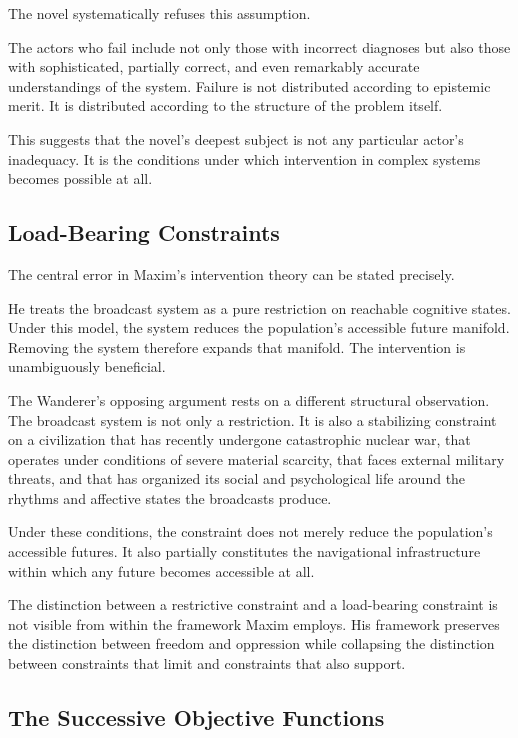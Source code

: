\documentclass[12pt, a4paper]{article}
\theoremstyle{plain}
\theoremstyle{definition}
\theoremstyle{remark}
\begin{document}
The novel systematically refuses this assumption.

The actors who fail include not only those with
incorrect diagnoses but also those with
sophisticated, partially correct, and even
remarkably accurate understandings of the system.
Failure is not distributed according to epistemic
merit. It is distributed according to the structure
of the problem itself.

This suggests that the novel's deepest subject is
not any particular actor's inadequacy. It is the
conditions under which intervention in complex
systems becomes possible at all.

\subsection{Load-Bearing Constraints}

The central error in Maxim's intervention theory
can be stated precisely.

He treats the broadcast system as a pure restriction
on reachable cognitive states. Under this model,
the system reduces the population's accessible
future manifold. Removing the system therefore
expands that manifold. The intervention is
unambiguously beneficial.

The Wanderer's opposing argument rests on a
different structural observation. The broadcast
system is not only a restriction. It is also a
stabilizing constraint on a civilization that has
recently undergone catastrophic nuclear war, that
operates under conditions of severe material
scarcity, that faces external military threats,
and that has organized its social and psychological
life around the rhythms and affective states the
broadcasts produce.

Under these conditions, the constraint does not
merely reduce the population's accessible futures.
It also partially constitutes the navigational
infrastructure within which any future becomes
accessible at all.

The distinction between a restrictive constraint
and a load-bearing constraint is not visible from
within the framework Maxim employs. His framework
preserves the distinction between freedom and
oppression while collapsing the distinction between
constraints that limit and constraints that also
support.

\subsection{The Successive Objective Functions}
\end{document}
